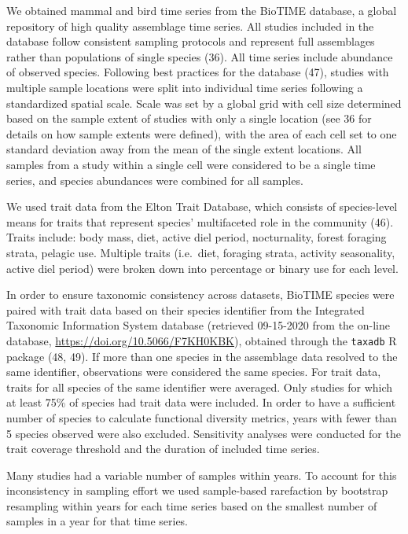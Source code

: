 \documentclass{article}
\begin{document}
We obtained mammal and bird time series from the BioTIME database, a
global repository of high quality assemblage time series. All studies
included in the database follow consistent sampling protocols and
represent full assemblages rather than populations of single species
(36). All time series include abundance of observed species. Following
best practices for the database (47), studies with multiple sample
locations were split into individual time series following a
standardized spatial scale. Scale was set by a global grid with cell
size determined based on the sample extent of studies with only a single
location (see 36 for details on how sample extents were defined), with
the area of each cell set to one standard deviation away from the mean
of the single extent locations. All samples from a study within a single
cell were considered to be a single time series, and species abundances
were combined for all samples.

We used trait data from the Elton Trait Database, which consists of
species-level means for traits that represent species' multifaceted role
in the community (46). Traits include: body mass, diet, active diel
period, nocturnality, forest foraging strata, pelagic use. Multiple
traits (i.e.~diet, foraging strata, activity seasonality, active diel
period) were broken down into percentage or binary use for each level.

In order to ensure taxonomic consistency across datasets, BioTIME
species were paired with trait data based on their species identifier
from the Integrated Taxonomic Information System database (retrieved
09-15-2020 from the on-line database,
\url{https://doi.org/10.5066/F7KH0KBK}), obtained through the
\texttt{taxadb} R package (48, 49). If more than one species in the
assemblage data resolved to the same identifier, observations were
considered the same species. For trait data, traits for all species of
the same identifier were averaged. Only studies for which at least 75\%
of species had trait data were included. In order to have a sufficient
number of species to calculate functional diversity metrics, years with
fewer than 5 species observed were also excluded. Sensitivity analyses
were conducted for the trait coverage threshold and the duration of
included time series.

Many studies had a variable number of samples within years. To account
for this inconsistency in sampling effort we used sample-based
rarefaction by bootstrap resampling within years for each time series
based on the smallest number of samples in a year for that time series.
\end{document}
